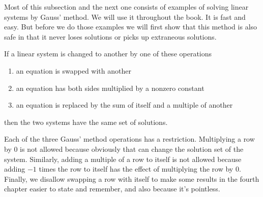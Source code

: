 Most of this subsection and the next one consists of examples
of solving linear systems by Gauss' method.
We will use it throughout the book.
It is fast and easy.
But before we do those examples we will first show that
this method is also safe in that it never loses solutions or 
picks up extraneous solutions.

\begin{theorem}
 \label{th:GaussMethod}
If a linear system is changed to another by one of these operations
\begin{enumerate}
  \setlength{\itemsep}{0ex}
  \item
    an equation is swapped with another
  \item
    an equation has both sides multiplied by a nonzero constant
  \item
    an equation is replaced by the sum of itself and a multiple of another
\end{enumerate}
then the two systems have the same set of solutions.
\end{theorem}

Each of the three Gauss' method operations has a restriction.
Multiplying a row by \( 0 \) is not allowed because obviously that
can change the solution set of the system.
Similarly, adding a multiple of a row to itself is not allowed because
adding \( -1 \) times the row to itself has the effect of multiplying the row
by \( 0 \).
Finally, we disallow swapping a row with itself
to make some results in the fourth chapter easier to state and remember,
and also because it's pointless.

